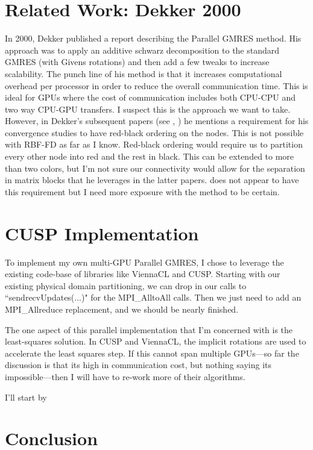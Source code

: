\documentclass[10pt]{article}
\begin{document}
\section{Related Work: Dekker 2000}
In 2000, Dekker \cite{Dekker2000} published a report describing the Parallel GMRES method. His approach was to apply an additive schwarz decomposition to the standard GMRES (with Givens rotations) and then add a few tweaks to increase scalability. The punch line of his method is that it increases computational overhead per processor in order to reduce the overall communication time. This is ideal for GPUs where the cost of communication includes both CPU-CPU and two way CPU-GPU transfers. I suspect this is the approach we want to take. However, in Dekker's subsequent papers (see \cite{Dekker2001}, \cite{Dekker2005}) he mentions a requirement for his convergence studies to have red-black ordering on the nodes. This is not possible with RBF-FD as far as I know. Red-black ordering would require us to partition every other node into red and the rest in black. This can be extended to more than two colors, but I'm not sure our connectivity would allow for the separation in matrix blocks that he leverages in the latter papers. \cite{Dekker2000} does not appear to have this requirement but I need more exposure with the method to be certain.  


\section{CUSP Implementation} 

To implement my own multi-GPU Parallel GMRES, I chose to leverage the existing code-base of libraries like ViennaCL and CUSP. Starting with our existing physical domain partitioning, we can drop in our calls to ``sendrecvUpdates(...)" for the MPI\_AlltoAll calls. Then we just need to add an MPI\_Allreduce replacement, and we should be nearly finished. 

The one aspect of this parallel implementation that I'm concerned with is the least-squares solution. In CUSP and ViennaCL, the implicit rotations are used to accelerate the least squares step. If this cannot span multiple GPUs---so far the discussion is that its high in communication cost, but nothing saying its impossible---then I will have to re-work more of their algorithms. 

I'll start by 

\section{Conclusion}




\end{document}
